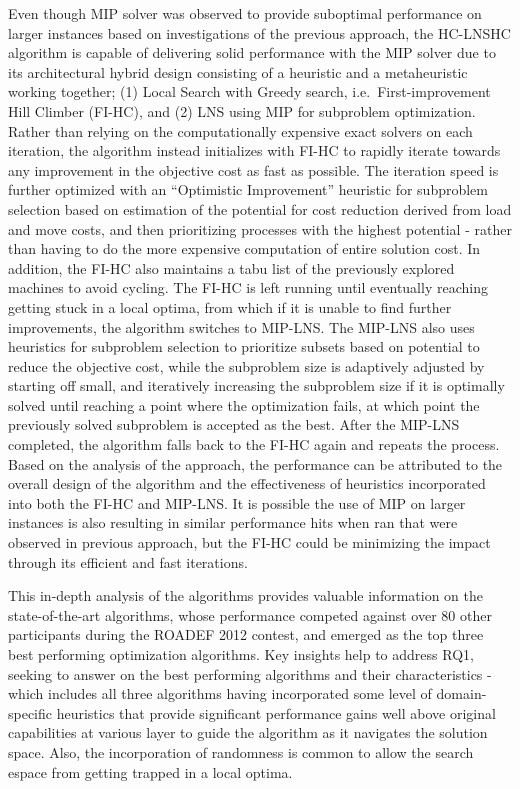 \documentclass[a4paper,12pt]{Classes/RoboticsLaTeX}
\begin{document}
Even though MIP solver was observed to provide suboptimal performance on
larger instances based on investigations of the previous approach, the
HC-LNSHC algorithm is capable of delivering solid performance with the
MIP solver due to its architectural hybrid design consisting of a heuristic and a
metaheuristic working together; (1) Local Search with Greedy search,
i.e.~First-improvement Hill Climber (FI-HC), and (2) LNS using MIP for
subproblem optimization. Rather than relying on the computationally
expensive exact solvers on each iteration, the algorithm instead
initializes with FI-HC to rapidly iterate towards any improvement in the
objective cost as fast as possible. The iteration speed is further
optimized with an ``Optimistic Improvement'' heuristic for subproblem
selection based on estimation of the potential for cost reduction
derived from load and move costs, and then prioritizing processes with
the highest potential - rather than having to do the more expensive
computation of entire solution cost. In addition, the FI-HC also
maintains a tabu list of the previously explored machines to avoid
cycling. The FI-HC is left running until eventually reaching getting
stuck in a local optima, from which if it is unable to find further
improvements, the algorithm switches to MIP-LNS. The MIP-LNS also uses
heuristics for subproblem selection to prioritize subsets based on
potential to reduce the objective cost, while the subproblem size is
adaptively adjusted by starting off small, and iteratively increasing
the subproblem size if it is optimally solved until reaching a point
where the optimization fails, at which point the previously solved
subproblem is accepted as the best. After the MIP-LNS completed, the
algorithm falls back to the FI-HC again and repeats the process. Based
on the analysis of the approach, the performance can be attributed to
the overall design of the algorithm and the effectiveness of heuristics
incorporated into both the FI-HC and MIP-LNS. It is possible the use of
MIP on larger instances is also resulting in similar performance hits
when ran that were observed in previous approach, but the FI-HC could be
minimizing the impact through its efficient and fast iterations.

This in-depth analysis of the algorithms provides valuable information on the state-of-the-art algorithms, whose performance competed against over 80 other participants during the ROADEF 2012 contest, and emerged as the top three best performing optimization algorithms. Key insights help to address RQ1, seeking to answer on the best performing algorithms and their characteristics - which includes all three algorithms having incorporated some level of domain-specific heuristics that provide significant performance gains well above original capabilities at various layer to guide the algorithm as it navigates the solution space. Also, the incorporation of randomness is common to allow the search espace from getting trapped in a local optima.
\end{document}

